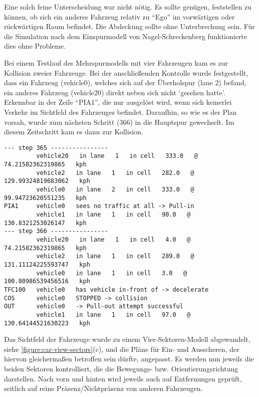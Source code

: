 Eine solch feine Unterscheidung war nicht nötig.
Es sollte genügen, feststellen zu können, ob sich ein anderes Fahrzeug relativ zu \enquote{Ego} im vorwärtigen oder rückwärtigen Raum befindet. 
Die Abdeckung sollte ohne Unterbrechung sein.
Für die Simulation nach dem Einspurmodell von Nagel-Schreckenberg funktionierte dies ohne Probleme.

Bei einem Testlauf des Mehrspurmodells mit vier Fahrzeugen kam es zur Kollision zweier Fahrzeuge. 
Bei der anschließenden Kontrolle wurde festgestellt, dass ein Fahrzeug (vehicle0), welches sich auf der Überholspur (lane 2) befand, ein anderes Fahrzeug (vehicle20) direkt neben sich nicht \enquote*{gesehen hatte}. 
Erkennbar in der Zeile \enquote{PIA1}, die nur ausgelöst wird, wenn sich keinerlei Verkehr im Sichtfeld des Fahrzeuges befindet.
Daraufhin, so wie es der Plan vorsah, wurde zum nächsten Schritt (366) in die Hauptspur gewechselt. 
Im diesem Zeitschritt kam es dann zur Kollision.

\footnotesize\begin{verbatim}
--- step 365 ----------------
         vehicle20   in lane   1   in cell   333.0   @   74.21582362319865   kph
         vehicle2   in lane   1   in cell   282.0   @   129.99324819683062   kph
         vehicle0   in lane   2   in cell   333.0   @   99.94723620551235   kph
PIA1     vehicle0   sees no traffic at all -> Pull-in
         vehicle1   in lane   1   in cell   90.0   @   130.8321253026147   kph
--- step 366 ----------------
         vehicle20   in lane   1   in cell   4.0   @   74.21582362319865   kph
         vehicle2   in lane   1   in cell   289.0   @   131.11124225593747   kph
         vehicle0   in lane   1   in cell   3.0   @   100.80986539456516   kph
TFC100   vehicle0   has vehicle in-front of -> decelerate
COS      vehicle0   STOPPED -> collision
OUT      vehicle0   -> Pull-out attempt successful
         vehicle1   in lane   1   in cell   97.0   @   130.64144521630223   kph
\end{verbatim}
\normalsize

Das Sichtfeld der Fahrzeuge wurde zu einem Vier-Sektoren-Modell abgewandelt, siehe \cref{figure:car-view-sectors}(c), und die Pläne für Ein- und Ausscheren, der hiervon gleichermaßen betroffen sein dürfte, angepasst.
Es werden nun jeweils die beiden Sektoren kontrolliert, die die Bewegungs- bzw. Orientierungsrichtung darstellen. 
Nach vorn und hinten wird jeweils auch auf Entfernungen geprüft, seitlich auf reine Präsenz/Nichtpräsenz von anderen Fahrzeugen.

